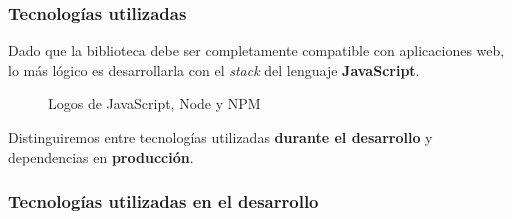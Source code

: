 \documentclass{beamer}
\begin{document}
\begin{frame}
\frametitle{Tecnologías utilizadas}

Dado que la biblioteca debe ser completamente compatible con aplicaciones web, lo más lógico es desarrollarla con el \textit{stack} del lenguaje \textbf{JavaScript}.

\begin{figure}
    \centering
    \qquad
    \qquad
    \caption{Logos de JavaScript, Node y NPM}
    \label{fig:1}
\end{figure}

Distinguiremos entre tecnologías utilizadas \textbf{durante el desarrollo} y dependencias en \textbf{producción}.

\end{frame}

\subsubsection{Tecnologías utilizadas en el desarrollo}
\end{document}
